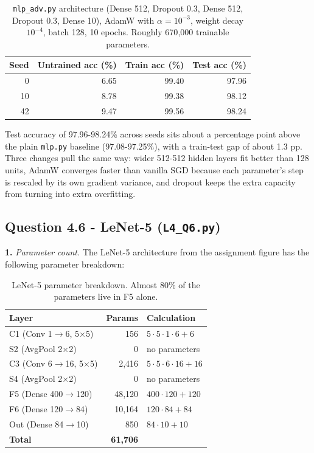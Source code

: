 \documentclass[11pt,a4paper]{article}
\newcommand{\Q}[1]{\subsection*{Question #1}}
\newcommand{\Qpart}[1]{\textbf{#1.}}
\begin{document}
\begin{table}[h]
\centering
\small
\begin{tabular}{rrrr}
\toprule
Seed & Untrained acc (\%) & Train acc (\%) & Test acc (\%) \\
\midrule
0  & 6.65 & 99.40 & 97.96 \\
10 & 8.78 & 99.38 & 98.12 \\
42 & 9.47 & 99.56 & 98.24 \\
\bottomrule
\end{tabular}
\caption{\texttt{mlp\_adv.py} architecture (Dense 512, Dropout 0.3, Dense 512, Dropout 0.3, Dense 10), AdamW with $\alpha = 10^{-3}$, weight decay $10^{-4}$, batch 128, 10 epochs. Roughly 670{,}000 trainable parameters.}
\end{table}

Test accuracy of 97.96-98.24\% across seeds sits about a percentage point above the plain \texttt{mlp.py} baseline (97.08-97.25\%), with a train-test gap of about 1.3 pp. Three changes pull the same way: wider 512-512 hidden layers fit better than 128 units, AdamW converges faster than vanilla SGD because each parameter's step is rescaled by its own gradient variance, and dropout keeps the extra capacity from turning into extra overfitting.

\Q{4.6 - LeNet-5 (\texttt{L4\_Q6.py})}

\Qpart{1} \textit{Parameter count.} The LeNet-5 architecture from the assignment figure has the following parameter breakdown:

\begin{table}[h]
\centering
\small
\begin{tabular}{lrl}
\toprule
Layer & Params & Calculation \\
\midrule
C1 (Conv 1$\to$6, 5$\times$5)         & 156    & $5\cdot 5\cdot 1\cdot 6 + 6$ \\
S2 (AvgPool 2$\times$2)              & 0      & no parameters \\
C3 (Conv 6$\to$16, 5$\times$5)         & 2{,}416 & $5\cdot 5\cdot 6\cdot 16 + 16$ \\
S4 (AvgPool 2$\times$2)              & 0      & no parameters \\
F5 (Dense 400$\to$120)              & 48{,}120 & $400\cdot 120 + 120$ \\
F6 (Dense 120$\to$84)               & 10{,}164 & $120\cdot 84 + 84$ \\
Out (Dense 84$\to$10)               & 850     & $84\cdot 10 + 10$ \\
\midrule
\textbf{Total}                      & \textbf{61{,}706} & \\
\bottomrule
\end{tabular}
\caption{LeNet-5 parameter breakdown. Almost 80\% of the parameters live in F5 alone.}
\end{table}
\end{document}

